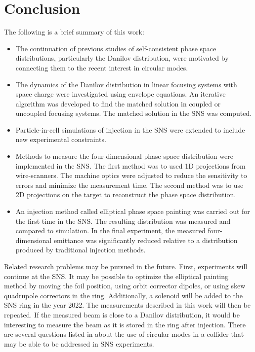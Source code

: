 \chapter{Conclusion} \label{chap-6}

The following is a brief summary of this work:
%
\begin{itemize}
    \item The continuation of previous studies of self-consistent phase space distributions, particularly the Danilov distribution, were motivated by connecting them to the recent interest in circular modes.
    \item The dynamics of the Danilov distribution in linear focusing systems with space charge were investigated using envelope equations. An iterative algorithm was developed to find the matched solution in coupled or uncoupled focusing systems. The matched solution in the SNS was computed.
    \item Particle-in-cell simulations of injection in the SNS were extended to include new experimental constraints. 
    \item Methods to measure the four-dimensional phase space distribution were implemented in the SNS. The first method was to used 1D projections from wire-scanners. The machine optics were adjusted to reduce the sensitivity to errors and minimize the measurement time. The second method was to use 2D projections on the target to reconstruct the phase space distribution. 
    \item An injection method called elliptical phase space painting was carried out for the first time in the SNS. The resulting distribution was measured and compared to simulation. In the final experiment, the measured four-dimensional emittance was significantly reduced relative to a distribution produced by traditional injection methods.
\end{itemize}
%

Related research problems may be pursued in the future. First, experiments will continue at the SNS. It may be possible to optimize the elliptical painting method by moving the foil position, using orbit corrector dipoles, or using skew quadrupole correctors in the ring. Additionally, a solenoid will be added to the SNS ring in the year 2022. The measurements described in this work will then be repeated. If the measured beam is close to a Danilov distribution, it would be interesting to measure the beam as it is stored in the ring after injection. There are several questions listed in \cite{Burov2013} about the use of circular modes in a collider that may be able to be addressed in SNS experiments.

